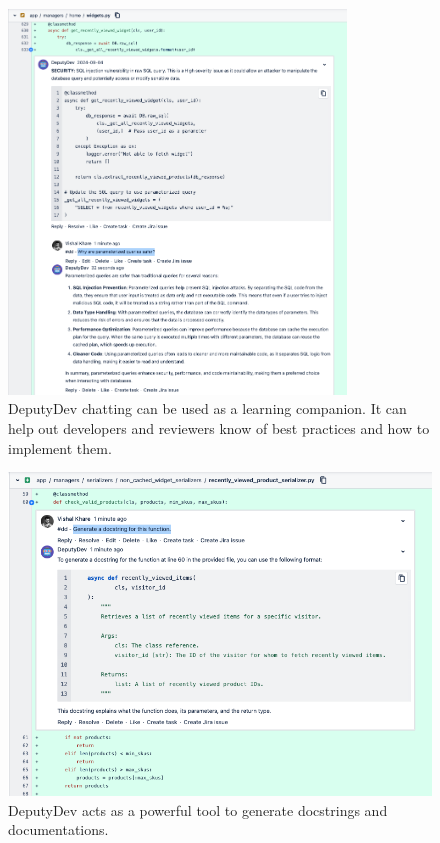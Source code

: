 \begin{appendices}
\begin{figure}[htbp]
    \centering
    \includegraphics[width=0.8\textwidth]
    {Figures/dd_param_query.png}
    \caption{DeputyDev chatting can be used as a learning companion. It can help out developers and reviewers know of best practices and how to implement them.}
    \label{fig:dd_param_query}
\end{figure}

\begin{figure}[htbp]
    \centering
    \includegraphics[scale=0.40]
    {Figures/dd_docstring.png}
    \caption{DeputyDev acts as a powerful tool to generate docstrings and documentations.}
    \label{fig:dd_docstring}
\end{figure}


\end{appendices}
